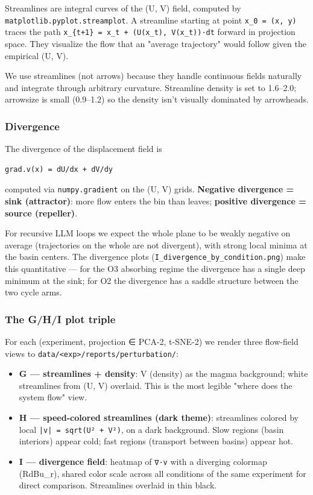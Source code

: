 \documentclass{article}
\theoremstyle{plain}
\theoremstyle{definition}
\begin{document}
Streamlines are integral curves of the (U, V) field, computed by
\texttt{matplotlib.pyplot.streamplot}. A streamline starting at point
\texttt{x\_0 = (x, y)} traces the path \texttt{x\_\{t+1\} = x\_t + (U(x\_t), V(x\_t))·dt}
forward in projection space. They visualize the flow that an
"average trajectory" would follow given the empirical (U, V).

We use streamlines (not arrows) because they handle continuous fields
naturally and integrate through arbitrary curvature. Streamline density
is set to 1.6–2.0; arrowsize is small (0.9–1.2) so the density isn't
visually dominated by arrowheads.

\subsubsection{Divergence}

The divergence of the displacement field is

\begin{verbatim}
grad.v(x) = dU/dx + dV/dy
\end{verbatim}

computed via \texttt{numpy.gradient} on the (U, V) grids. \textbf{Negative
divergence = sink (attractor)}: more flow enters the bin than leaves;
\textbf{positive divergence = source (repeller)}.

For recursive LLM loops we expect the whole plane to be weakly negative
on average (trajectories on the whole are not divergent), with strong
local minima at the basin centers. The divergence plots
(\texttt{I\_divergence\_by\_condition.png}) make this quantitative — for the O3
absorbing regime the divergence has a single deep minimum at the sink;
for O2 the divergence has a saddle structure between the two cycle
arms.

\subsubsection{The G/H/I plot triple}

For each (experiment, projection ∈ {PCA-2, t-SNE-2}) we render three
flow-field views to \texttt{data/<exp>/reports/perturbation/}:

\begin{itemize}
  \item \textbf{G — streamlines + density}: V (density) as the magma background;
  white streamlines from (U, V) overlaid. This is the most legible
  "where does the system flow" view.
  \item \textbf{H — speed-colored streamlines (dark theme)}: streamlines colored
  by local \texttt{|v| = sqrt(U² + V²)}, on a dark background. Slow regions
  (basin interiors) appear cold; fast regions (transport between
  basins) appear hot.
  \item \textbf{I — divergence field}: heatmap of \texttt{∇·v} with a diverging colormap
  (RdBu\_r), shared color scale across all conditions of the same
  experiment for direct comparison. Streamlines overlaid in thin black.
\end{itemize}
\end{document}
